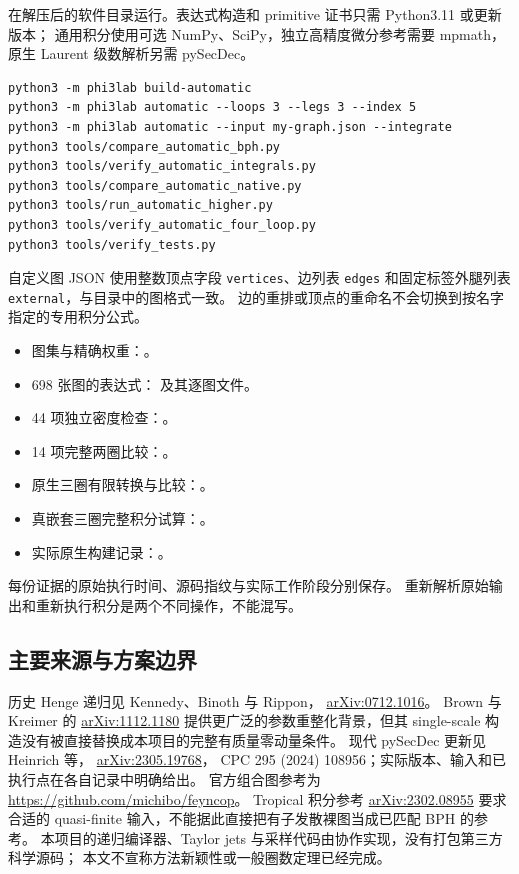 在解压后的软件目录运行。表达式构造和 primitive 证书只需 Python3.11 或更新版本；
通用积分使用可选 NumPy、SciPy，独立高精度微分参考需要 mpmath，
原生 Laurent 级数解析另需 pySecDec。
\begin{samepage}
\begin{verbatim}
python3 -m phi3lab build-automatic
python3 -m phi3lab automatic --loops 3 --legs 3 --index 5
python3 -m phi3lab automatic --input my-graph.json --integrate
python3 tools/compare_automatic_bph.py
python3 tools/verify_automatic_integrals.py
python3 tools/compare_automatic_native.py
python3 tools/run_automatic_higher.py
python3 tools/verify_automatic_four_loop.py
python3 tools/verify_tests.py
\end{verbatim}
\end{samepage}
自定义图 JSON 使用整数顶点字段 \texttt{vertices}、边列表 \texttt{edges}
和固定标签外腿列表 \texttt{external}，与目录中的图格式一致。
边的重排或顶点的重命名不会切换到按名字指定的专用积分公式。

\begin{itemize}
\item 图集与精确权重：。
\item 698 张图的表达式： 及其逐图文件。
\item 44 项独立密度检查：。
\item 14 项完整两圈比较：。
\item 原生三圈有限转换与比较：。
\item 真嵌套三圈完整积分试算：。
\item 实际原生构建记录：。
\end{itemize}
每份证据的原始执行时间、源码指纹与实际工作阶段分别保存。
重新解析原始输出和重新执行积分是两个不同操作，不能混写。

\subsection{主要来源与方案边界}

历史 Henge 递归见 Kennedy、Binoth 与 Rippon，
\href{https://arxiv.org/abs/0712.1016}{arXiv:0712.1016}。
Brown 与 Kreimer 的
\href{https://arxiv.org/abs/1112.1180}{arXiv:1112.1180}
提供更广泛的参数重整化背景，但其 single-scale 构造没有被直接替换成本项目的完整有质量零动量条件。
现代 pySecDec 更新见 Heinrich 等，
\href{https://arxiv.org/abs/2305.19768}{arXiv:2305.19768}，
CPC 295 (2024) 108956；实际版本、输入和已执行点在各自记录中明确给出。
官方组合图参考为 \url{https://github.com/michibo/feyncop}。
Tropical 积分参考
\href{https://arxiv.org/abs/2302.08955}{arXiv:2302.08955}
要求合适的 quasi-finite 输入，不能据此直接把有子发散裸图当成已匹配 BPH 的参考。
本项目的递归编译器、Taylor jets 与采样代码由协作实现，没有打包第三方科学源码；
本文不宣称方法新颖性或一般圈数定理已经完成。

